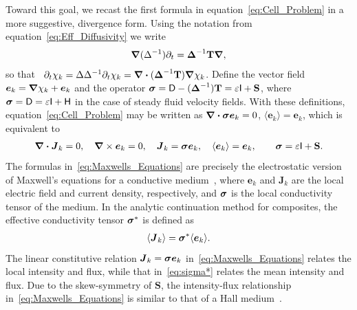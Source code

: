 \documentclass[leqno,onefignum,onetabnum]{siamltex1213}
\newcommand{\Tb}{\mathbf{T}}
\newcommand{\Sb}{\mathbf{S}}
\newcommand{\Dm}{\mathsf{D}}
\newcommand{\Hm}{\mathsf{H}}
\newcommand{\Ib}{\mathsf{I}}
\newcommand\bsig{\mbox{\boldmath${\sigma}$}}
\newcommand\bDelta{\mbox{\boldmath${\Delta}$}}
\newcommand\bnabla{\mbox{\boldmath${\nabla}$}}
\providecommand\bcdot{\boldsymbol{\cdot}}
\newcommand{\vecJ}{\boldsymbol{J}}
\newcommand{\vece}{\boldsymbol{e}}
\begin{document}
Toward this goal, we recast the first formula in
equation~\eqref{eq:Cell_Problem} in a more suggestive, divergence
form. Using 
the notation from equation~\eqref{eq:Eff_Diffusivity} we write 
%
\begin{align}%
  \bnabla (\Delta^{-1})\partial_t=\bDelta^{-1}\Tb\bnabla ,
\end{align}
%
so that~\cite{Fannjiang:1994:SIAM_JAM:333}
$\partial_t\chi_k=\Delta\Delta^{-1}\partial_t\chi_k=\bnabla \bcdot(\bDelta^{-1}\Tb)\bnabla \chi_k$. Define the  
vector field $\vece _k=\bnabla \chi_k+\vece _k$ and the operator
$\bsig=\Dm-(\bDelta^{-1})\Tb=\varepsilon\Ib+\Sb$, where
$\bsig=\Dm=\varepsilon\Ib+\Hm$ in the case of steady fluid velocity
fields. With these definitions, equation~\eqref{eq:Cell_Problem} may
be written as  $\bnabla \bcdot\bsig\vece _k=0$, $\langle\vece _k\rangle=\vece _k$,
which is equivalent to    
%
\begin{align}%
  \bnabla \bcdot\vecJ_k=0, \quad
  \bnabla \times\vece _k=0, \quad
  \vecJ_k=\bsig\vece _k,\quad
  \langle\vece _k\rangle=\vece _k,\qquad
  \bsig%
       =\varepsilon\Ib+\Sb.
\end{align}
%
The formulas in~\eqref{eq:Maxwells_Equations} are precisely the
electrostatic version of Maxwell's equations for a conductive
medium~\cite{Golden:CMP-473}, where $\vece _k$ and $\vecJ_k$ are the
local 
electric field and current density, respectively, and $\bsig$ is the
local conductivity tensor of the medium. In the analytic continuation method for composites,
the effective conductivity tensor $\bsig^*$ is defined as
% 
\begin{align}\label{eq:sigma*}
  \langle\vecJ_k\rangle=\bsig^*\langle\vece _k\rangle.
\end{align}
%
The linear constitutive relation $\vecJ_k=\bsig\vece _k$
in~\eqref{eq:Maxwells_Equations} relates the local intensity and flux, 
while that in~\eqref{eq:sigma*} relates the mean intensity and
flux. Due to the skew-symmetry of $\Sb$, the intensity-flux
relationship in~\eqref{eq:Maxwells_Equations} is similar to that of a
Hall medium~\cite{Isichenko:JNS:1991:375}.
\end{document}
